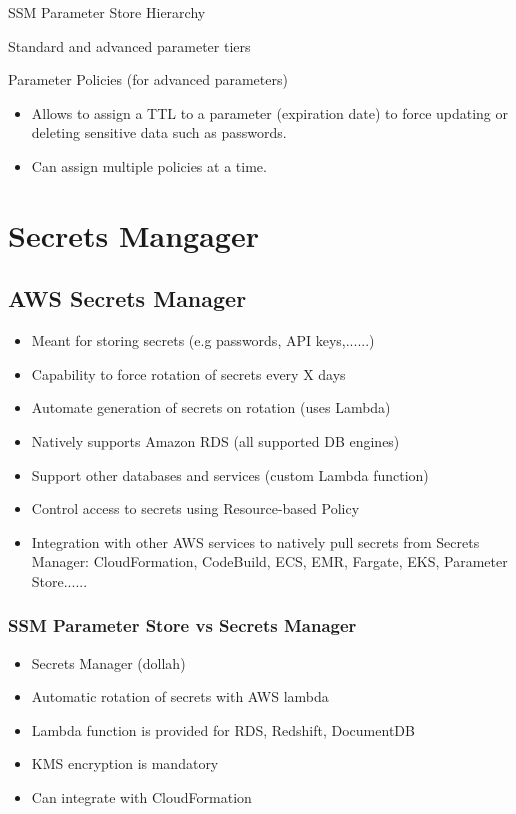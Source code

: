 
SSM Parameter Store Hierarchy


Standard and advanced parameter tiers


Parameter Policies (for advanced parameters)
\begin{itemize}
    \item Allows to assign a TTL to a parameter (expiration date) to force updating or deleting sensitive data such as passwords.
    \item Can assign multiple policies at a time.
\end{itemize}


\section{Secrets Mangager}

\subsection{AWS Secrets Manager}

\begin{itemize}
    \item Meant for storing secrets (e.g passwords, API keys,......)
    \item Capability to force rotation of secrets every X days
    \item Automate generation of secrets on rotation (uses Lambda)
    \item Natively supports Amazon RDS (all supported DB engines)
    \item Support other databases and services (custom Lambda function)
    \item Control access to secrets using Resource-based Policy
    \item Integration with other AWS services to natively pull secrets from Secrets Manager: CloudFormation, CodeBuild, ECS, EMR, Fargate, EKS, Parameter Store......
\end{itemize}



\subsubsection{SSM Parameter Store vs Secrets Manager}
\begin{itemize}
    \item  Secrets Manager (dollah)
    \item  Automatic rotation of secrets with AWS lambda
    \item  Lambda function is provided for RDS, Redshift, DocumentDB
    \item  KMS encryption is mandatory
    \item  Can integrate with CloudFormation
\end{itemize}


